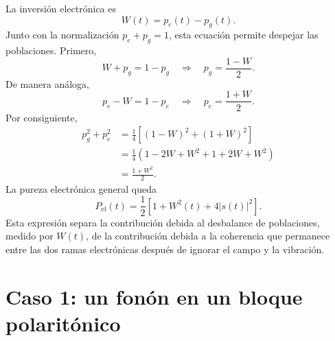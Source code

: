 \documentclass[11pt]{article}
\begin{document}
La inversi\'on electr\'onica es
\begin{equation}
  W(t)
  =
  p_e(t)-p_g(t).
\end{equation}
Junto con la normalizaci\'on $p_e+p_g=1$, esta ecuaci\'on permite despejar las
poblaciones. Primero,
\begin{equation}
  W+p_g=1-p_g
  \quad\Longrightarrow\quad
  p_g=\frac{1-W}{2}.
\end{equation}
De manera an\'aloga,
\begin{equation}
  p_e-W=1-p_e
  \quad\Longrightarrow\quad
  p_e=\frac{1+W}{2}.
\end{equation}
Por consiguiente,
\begin{equation}
\begin{aligned}
  p_g^2+p_e^2
  &=
  \frac14\left[(1-W)^2+(1+W)^2\right]
  \\
  &=
  \frac14\left(
  1-2W+W^2+1+2W+W^2
  \right)
  \\
  &=
  \frac{1+W^2}{2}.
\end{aligned}
\end{equation}
La pureza electr\'onica general queda
\begin{equation}
  \boxed{
  P_{\mathrm{el}}(t)
  =
  \frac12
  \left[
  1+W^2(t)+4|s(t)|^2
  \right].
  }
\end{equation}
Esta expresi\'on separa la contribuci\'on debida al desbalance de poblaciones,
medido por $W(t)$, de la contribuci\'on debida a la coherencia que permanece
entre las dos ramas electr\'onicas despu\'es de ignorar el campo y la vibraci\'on.

\section{Caso 1: un fon\'on en un bloque polarit\'onico}
\end{document}

